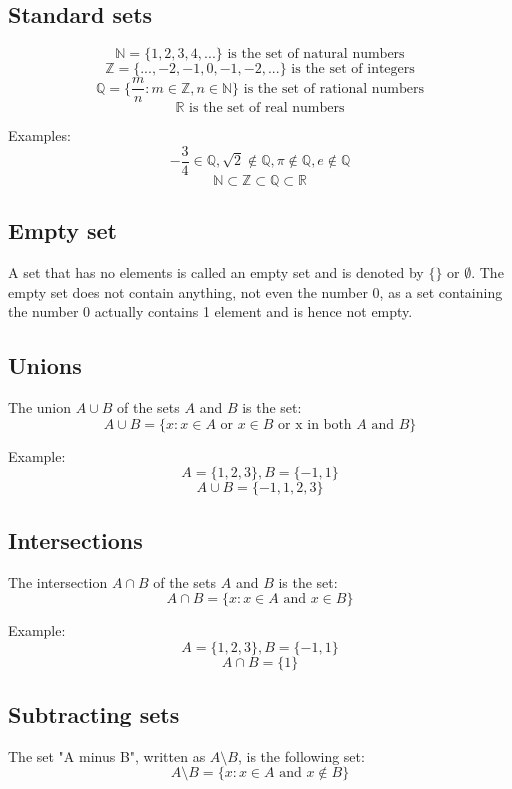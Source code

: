 \documentclass[11pt]{article}
\begin{document}
\subsection{Standard sets}
\label{sec:org24b2eb4}

\[\mathbb{N} = \{1, 2, 3, 4, ...\} \text{ is the set of natural numbers}\]
\[\mathbb{Z} = \{..., -2, -1, 0, -1, -2, ...\} \text{ is the set of integers}\]
\[\mathbb{Q} = \{\frac{m}{n} : m \in \mathbb{Z}, n \in \mathbb{N}\} \text{ is the set of rational numbers}\]
\[\mathbb{R} \text{ is the set of real numbers}\]

Examples:
\[-\frac{3}{4} \in \mathbb{Q}, \sqrt{2} \notin \mathbb{Q}, \pi \notin \mathbb{Q}, e \notin \mathbb{Q}\]
\[\mathbb{N} \subset \mathbb{Z} \subset \mathbb{Q} \subset \mathbb{R}\]

\subsection{Empty set}
\label{sec:org70fea7c}
A set that has no elements is called an empty set and is denoted by \(\{\}\) or \(\emptyset\). The empty set does not contain anything, not even the number 0, as a set containing the number 0 actually contains 1 element and is hence not empty.

\subsection{Unions}
\label{sec:org779d557}
The union \(A \cup B\) of the sets \(A\) and \(B\) is the set:
\[A \cup B = \{ x : x \in A \text{ or } x \in B \text{ or x in both } A \text{ and } B\}\]

Example:
\[A = \{1, 2, 3\}, B = \{-1, 1\}\]
\[A \cup B = \{-1, 1, 2, 3\}\]

\subsection{Intersections}
\label{sec:org34e4aa9}
The intersection \(A \cap B\) of the sets \(A\) and \(B\) is the set:
\[A \cap B = \{ x : x \in A \text{ and } x \in B\}\]

Example:
\[A = \{1, 2, 3\}, B = \{-1, 1\}\]
\[A \cap B = \{1\}\]

\subsection{Subtracting sets}
\label{sec:org8776bc9}
The set "A minus B", written as \(A \setminus B\), is the following set:
\[A \setminus B = \{ x : x \in A \text{ and } x \notin B\}\]
\end{document}
